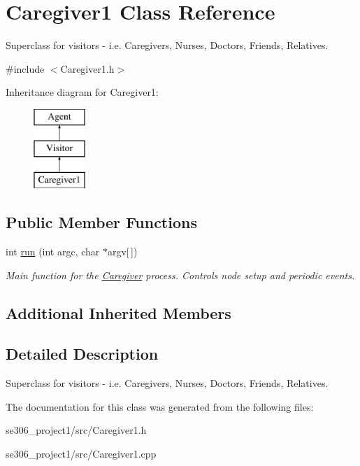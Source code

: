 \hypertarget{classCaregiver1}{\section{Caregiver1 Class Reference}
\label{classCaregiver1}
}


Superclass for visitors -\/ i.\-e. Caregivers, Nurses, Doctors, Friends, Relatives.  




{\ttfamily \#include $<$Caregiver1.\-h$>$}

Inheritance diagram for Caregiver1\-:\begin{figure}[H]
\begin{center}
\leavevmode
\includegraphics[height=3.000000cm]{classCaregiver1}
\end{center}
\end{figure}
\subsection*{Public Member Functions}
\begin{DoxyCompactItemize}
\item 
\hypertarget{classCaregiver1_a71affa8e6bfe53f238ab3ca27dbdab6a}{int \hyperlink{classCaregiver1_a71affa8e6bfe53f238ab3ca27dbdab6a}{run} (int argc, char $\ast$argv\mbox{[}$\,$\mbox{]})}\label{classCaregiver1_a71affa8e6bfe53f238ab3ca27dbdab6a}

\begin{DoxyCompactList}\small\item\em Main function for the \hyperlink{classCaregiver}{Caregiver} process. Controls node setup and periodic events. \end{DoxyCompactList}\end{DoxyCompactItemize}
\subsection*{Additional Inherited Members}


\subsection{Detailed Description}
Superclass for visitors -\/ i.\-e. Caregivers, Nurses, Doctors, Friends, Relatives. 

The documentation for this class was generated from the following files\-:\begin{DoxyCompactItemize}
\item 
se306\-\_\-project1/src/Caregiver1.\-h\item 
se306\-\_\-project1/src/Caregiver1.\-cpp\end{DoxyCompactItemize}
